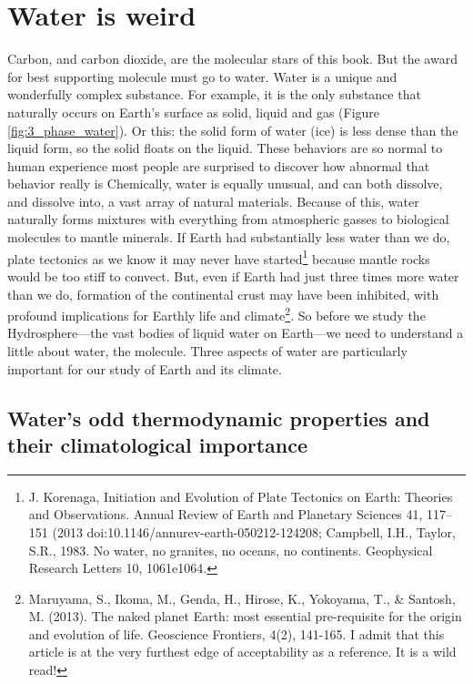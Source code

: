 \documentclass[amstex,12pt]{book}
\begin{document}
\section{Water is weird} \label{Water is Weird}
Carbon, and carbon dioxide, are the molecular stars of this book. But the award for best supporting molecule must go to water. Water is a unique and wonderfully complex substance. For example, it is the only substance that naturally occurs on Earth's surface as solid, liquid and gas (Figure \ref{fig:3_phase_water}). Or this: the solid form of water (ice) is less dense than the liquid form, so the solid floats on the liquid. These behaviors are so normal to human experience most people are surprised to discover how abnormal that behavior really is Chemically, water is equally unusual, and can both dissolve, and dissolve into, a vast array of natural materials. Because of this, water naturally forms mixtures with everything from atmospheric gasses to biological molecules to mantle minerals. If Earth had substantially less water than we do, plate tectonics as we know it may never have started\footnote{J. Korenaga, Initiation and Evolution of Plate Tectonics on Earth: Theories and Observations. Annual Review of Earth and Planetary Sciences 41, 117–151 (2013 doi:10.1146/annurev-earth-050212-124208; Campbell, I.H., Taylor, S.R., 1983. No water, no granites, no oceans, no continents. Geophysical Research Letters 10, 1061e1064.} because mantle rocks would be too stiff to convect. But, even if Earth had just three times more water than we do, formation of the continental crust may have been inhibited, with profound implications for Earthly life and climate\footnote{Maruyama, S., Ikoma, M., Genda, H., Hirose, K., Yokoyama, T., \& Santosh, M. (2013). The naked planet Earth: most essential pre-requisite for the origin and evolution of life. Geoscience Frontiers, 4(2), 141-165. I admit that this article is at the very furthest edge of acceptability as a reference. It is a wild read!}. So before we study the Hydrosphere---the vast bodies of liquid water on Earth---we need to understand a little about water, the molecule. Three aspects of water are particularly important for our study of Earth and its climate. 
\subsection{Water's odd thermodynamic properties and their climatological importance}
\end{document}
